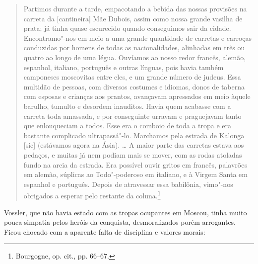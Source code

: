 \begin{quote}
Partimos durante a tarde, empacotando a bebida das nossas provisões na
carreta da {[}cantineira{]} Mãe Dubois, assim como nossa grande vasilha
de prata; já tinha quase escurecido quando conseguimos sair da cidade.
Encontramo"-nos em meio a uma grande quantidade de carretas e carroças
conduzidas por homens de todas as nacionalidades, alinhadas em três ou
quatro ao longo de uma légua. Ouvíamos ao nosso redor francês, alemão,
espanhol, italiano, português e outras línguas, pois havia também
camponeses moscovitas entre eles, e um grande número de judeus. Essa
multidão de pessoas, com diversos costumes e idiomas, donos de taberna
com esposas e crianças aos prantos, avançavam apressados em meio àquele
barulho, tumulto e desordem inauditos. Havia quem acabasse com a carreta
toda amassada, e por conseguinte urravam e praguejavam tanto que
enlouqueciam a todos. Esse era o comboio de toda a tropa e era bastante
complicado ultrapassá"-lo. Marchamos pela estrada de Kalonga {[}sic{]}
(estávamos agora na Ásia). \ldots{} A maior parte das carretas estava
aos pedaços, e muitas já nem podiam mais se mover, com as rodas atoladas
fundo na areia da estrada. Era possível ouvir gritos em francês,
palavrões em alemão, súplicas ao Todo"-poderoso em italiano, e à Virgem
Santa em espanhol e português. Depois de atravessar essa babilônia,
vimo"-nos obrigados a esperar pelo restante da coluna.\footnote{Bourgogne,
  op. cit., pp. 66--67.}
\end{quote}

Vossler, que não havia estado com as tropas ocupantes em Moscou, tinha
muito pouca simpatia pelos heróis da conquista, desmoralizados porém
arrogantes. Ficou chocado com a aparente falta de disciplina e valores
morais:

